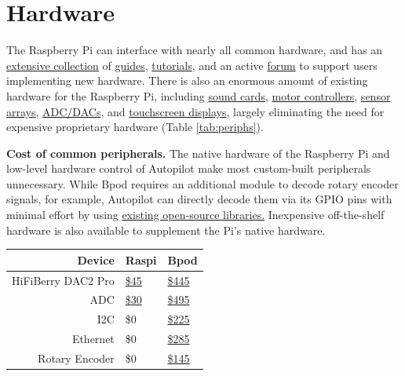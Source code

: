 \section{Hardware}
\label{sec:hardware}

The Raspberry Pi can interface with nearly all common hardware, and has an \href{https://www.raspberrypi.org/help/}{extensive collection} of \href{https://elinux.org/RPi_Guides}{guides}, \href{https://elinux.org/RPi_Tutorials}{tutorials}, and an active \href{https://www.raspberrypi.org/forums/}{forum} to support users implementing new hardware. There is also an enormous amount of existing hardware for the Raspberry Pi, including \href{https://www.hifiberry.com/}{sound cards}, \href{https://www.adafruit.com/product/2348}{motor controllers}, \href{https://www.digikey.com/product-detail/en/raspberry-pi/SENSE-HAT/1690-1013-ND/6196429}{sensor arrays}, \href{https://www.seeedstudio.com/Raspberry-Pi-High-Precision-AD-DA-Board-p-2765.html}{ADC/DACs}, and \href{https://www.digikey.com/product-detail/en/pimoroni-ltd/PIM369/1778-1221-ND/9521981}{touchscreen displays}, largely eliminating the need for expensive proprietary hardware (Table \ref{tab:periphs}). 

\begin{margintable}[0.3cm]
\caption{
\textbf{Cost of common peripherals.} The native hardware of the Raspberry Pi and low-level hardware control of Autopilot make most custom-built peripherals unnecessary. While Bpod requires an additional module to decode rotary encoder signals, for example, Autopilot can directly decode them via its GPIO pins with minimal effort by using \href{https://pypi.org/project/pigpio-encoder/}{existing open-source libraries.} Inexpensive off-the-shelf hardware is also available to supplement the Pi's native hardware.}
\label{tab:periphs}
\noindent\begin{tabularx}{\linewidth}{Rll}
\toprule
\textbf{Device} & Raspi & Bpod \\
\midrule
HiFiBerry DAC2 Pro & \href{https://www.hifiberry.com/shop/boards/hifiberry-dac2-pro/}{\$45} &  \href{https://sanworks.io/shop/viewproduct?productID=1032}{\$445}\\
ADC & \href{https://thepihut.com/products/high-precision-adc-hat-for-raspberry-pi-10-channel-32-bit}{\$30} & \href{https://sanworks.io/shop/viewproduct?productID=1021}{\$495}\\
I2C & \$0 & \href{https://sanworks.io/shop/viewproduct?productID=1019}{\$225} \\
Ethernet & \$0 & \href{https://sanworks.io/shop/viewproduct?productID=1025}{\$285} \\
Rotary Encoder & \$0 &  \href{https://sanworks.io/shop/viewproduct?productID=1022}{\$145}\\
\bottomrule
\end{tabularx}
\end{margintable}

